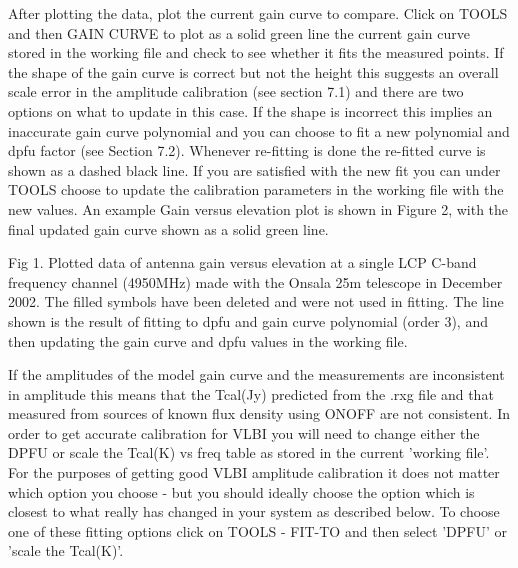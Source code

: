 After plotting the data, plot the current gain curve to compare.
Click on TOOLS and then GAIN CURVE to plot as a solid green 
line  the current gain curve stored in the working file  and check to 
see whether it fits the measured points. If the shape of the gain curve is 
correct but not the height this suggests an overall scale error in  the
amplitude   calibration (see section 7.1) and   there are two options on what
to 
update in this  case. If the shape is incorrect this implies an inaccurate gain curve
polynomial and you can choose to fit a new polynomial and dpfu factor 
(see Section 7.2). Whenever re-fitting is done the re-fitted  
curve  is shown as a dashed  black line. If you are satisfied with the new fit 
you can under TOOLS choose to update the calibration parameters in 
the working file with the new values. 
An example Gain  versus elevation plot is shown in Figure 2, with the 
final updated gain curve shown as a solid green line. 



\centerline{}
\noindent Fig 1. Plotted data of antenna gain versus elevation 
at a single LCP C-band frequency  channel (4950MHz) made with the Onsala 
25m telescope in December 2002. The filled symbols have been deleted 
and were not used in fitting. The line shown is the result of
fitting to dpfu and gain curve polynomial (order 3), and then updating 
the gain curve and dpfu values in the working file.

\vskip 0.5cm

 
\vskip 0.5cm

   If the amplitudes of the model gain curve and the measurements are 
   inconsistent in amplitude this means that the Tcal(Jy) 
   predicted from the .rxg file and that measured from sources
   of known flux density using ONOFF are not consistent.
   In order to get accurate calibration for VLBI  you will  
   need to change either the DPFU or scale the  Tcal(K) vs freq table
   as stored in the current 'working file'.  For the purposes 
    of getting good VLBI amplitude calibration it does not matter which 
    option you choose - but you should ideally choose the option which is 
    closest to what really has changed in your system as described below.
   To choose one of these fitting options click on TOOLS - FIT-TO and then 
   select  'DPFU' or  'scale the Tcal(K)'. 

\vskip 0.5cm

